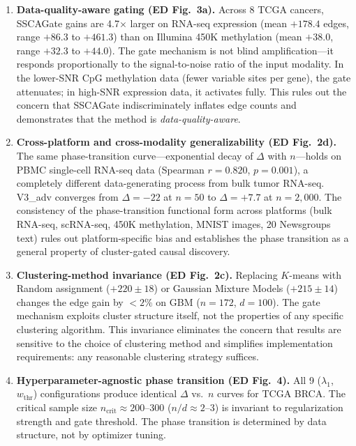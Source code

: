 \documentclass[12pt,a4paper]{article}
\begin{document}
\begin{enumerate}

\item \textbf{Data-quality-aware gating (ED Fig.\ 3a).}
Across 8 TCGA cancers, SSCAGate gains are 4.7$\times$ larger on RNA-seq expression (mean $+178.4$ edges, range $+86.3$ to $+461.3$) than on Illumina 450K methylation (mean $+38.0$, range $+32.3$ to $+44.0$).
The gate mechanism is not blind amplification---it responds proportionally to the signal-to-noise ratio of the input modality.
In the lower-SNR CpG methylation data (fewer variable sites per gene), the gate attenuates; in high-SNR expression data, it activates fully.
This rules out the concern that SSCAGate indiscriminately inflates edge counts and demonstrates that the method is \emph{data-quality-aware}.

\item \textbf{Cross-platform and cross-modality generalizability (ED Fig.\ 2d).}
The same phase-transition curve---exponential decay of $\Delta$ with $n$---holds on PBMC single-cell RNA-seq data (Spearman $r = 0.820$, $p = 0.001$), a completely different data-generating process from bulk tumor RNA-seq.
V3\_adv converges from $\Delta = -22$ at $n = 50$ to $\Delta = +7.7$ at $n = 2{,}000$.
The consistency of the phase-transition functional form across platforms (bulk RNA-seq, scRNA-seq, 450K methylation, MNIST images, 20 Newsgroups text) rules out platform-specific bias and establishes the phase transition as a general property of cluster-gated causal discovery.

\item \textbf{Clustering-method invariance (ED Fig.\ 2c).}
Replacing $K$-means with Random assignment ($+220 \pm 18$) or Gaussian Mixture Models ($+215 \pm 14$) changes the edge gain by $<2\%$ on GBM ($n = 172$, $d = 100$).
The gate mechanism exploits cluster structure itself, not the properties of any specific clustering algorithm.
This invariance eliminates the concern that results are sensitive to the choice of clustering method and simplifies implementation requirements: any reasonable clustering strategy suffices.

\item \textbf{Hyperparameter-agnostic phase transition (ED Fig.\ 4).}
All 9 ($\lambda_1$, $w_{\mathrm{thr}}$) configurations produce identical $\Delta$ vs.\ $n$ curves for TCGA BRCA.
The critical sample size $n_{\mathrm{crit}} \approx 200$--$300$ ($n/d \approx 2$--$3$) is invariant to regularization strength and gate threshold.
The phase transition is determined by data structure, not by optimizer tuning.


\end{enumerate}
\end{document}
